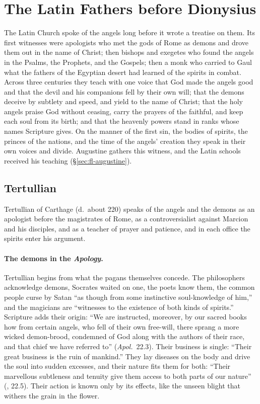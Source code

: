 \section{The Latin Fathers before Dionysius}\label{sec:fathers-latin}

The Latin Church spoke of the angels long before it wrote a treatise on
them. Its first witnesses were apologists who met the gods of Rome as
demons and drove them out in the name of Christ; then bishops and
exegetes who found the angels in the Psalms, the Prophets, and the
Gospels; then a monk who carried to Gaul what the fathers of the Egyptian
desert had learned of the spirits in combat. Across three centuries they
teach with one voice that God made the angels good and that the devil and
his companions fell by their own will; that the demons deceive by
subtlety and speed, and yield to the name of Christ; that the holy angels
praise God without ceasing, carry the prayers of the faithful, and keep
each soul from its birth; and that the heavenly powers stand in ranks
whose names Scripture gives. On the manner of the first sin, the bodies
of spirits, the princes of the nations, and the time of the angels'
creation they speak in their own voices and divide. Augustine gathers
this witness, and the Latin schools received his teaching
(\S\ref{sec:fl-augustine}).

\sectionguard
\subsection{Tertullian}\label{sec:fl-tertullian}

Tertullian of Carthage (d.~about 220) speaks of the angels and the demons
as an apologist before the magistrates of Rome,
as a controversialist against Marcion and his disciples, and as a teacher
of prayer and patience, and in each office the spirits enter his argument.

\paragraph{The demons in the \emph{Apology}.} Tertullian begins from what
the pagans themselves concede. The philosophers acknowledge demons,
Socrates waited on one, the poets know them, the common people curse by
Satan ``as though from some instinctive soul-knowledge of him,'' and the
magicians are ``witnesses to the existence of both kinds of spirits.''
Scripture adds their origin: ``We are instructed, moreover, by our sacred
books how from certain angels, who fell of their own free-will, there
sprang a more wicked demon-brood, condemned of God along with the authors
of their race, and that chief we have referred to'' (\emph{Apol.}\ 22.3).
Their business is single: ``Their great business is the ruin of mankind.''
They lay diseases on the body and drive the soul into sudden excesses, and
their nature fits them for both: ``Their marvellous subtleness and
tenuity give them access to both parts of our nature''
(, 22.5). Their action is known only by its
effects, like the unseen blight that withers the grain in the flower.

